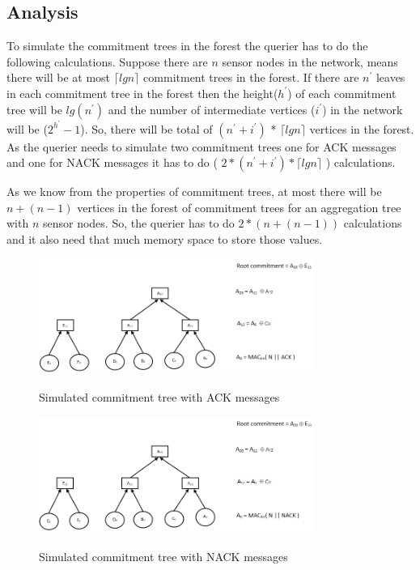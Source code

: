 \subsection{Analysis} %
\label{sub:analysis}

To simulate the commitment trees in the forest the querier has to do the following calculations. Suppose there are $n$ sensor nodes in the network, means there will be at most $\lceil lg n \rceil$ commitment trees in the forest. If there are $n^{'}$ leaves in each commitment tree in the forest then the height($h^{'}$) of each commitment tree will be $lg(n^{'})$ and the number of intermediate vertices ($i^{'}$) in the network will be ($ 2^{h^{'}} - 1 $). So, there will be total of  $ (n^{'} + i^{'}) $ * $\lceil lg  n \rceil $  vertices in the forest. As the querier needs to simulate two commitment trees one for ACK messages and one for NACK messages it has to do ( $ 2 * (n^{'} + i^{'}) * \lceil lg  n \rceil $ ) calculations.

As we know from the properties of commitment trees, at most there 
will be $n + ( n - 1 )$ vertices in the forest of commitment trees 
for an aggregation tree with $n$ sensor nodes. So, the querier has
to do $ 2 * ( n + ( n - 1 ) )$ calculations and it also need that much memory space to store those values.

\begin{figure}[t]
	\centering
		\includegraphics[width=0.8\textwidth]{ack.png}\\
		\caption{Simulated commitment tree with ACK messages}
	\label{fig:figure1}
\end{figure}

\begin{figure}[t]
	\centering
		\includegraphics[width=0.8\textwidth]{nack.png}\\
		\caption[Simulated commitment tree with NACK messages]{Simulated commitment tree with NACK messages}
	\label{fig:figure1}
\end{figure}

